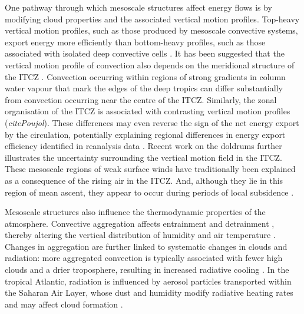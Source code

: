 \documentclass[acp, manuscript]{copernicus}
\begin{document}
One pathway through which mesoscale structures affect energy flows is by modifying cloud properties and the associated vertical motion profiles.
Top-heavy vertical motion profiles, such as those produced by mesoscale convective systems, export energy more efficiently than bottom-heavy profiles, such as those associated with isolated deep convective cells \citep[e.g.,][]{Houze2004}.
It has been suggested that the vertical motion profile of convection also depends on the meridional structure of the ITCZ \citep{masunagaEdgeIntensificationEastern2023}.
Convection occurring within regions of strong gradients in column water vapour that mark the edges of the deep tropics \citep{Mapes2018, masunagaMechanismMaintenanceSharp2020} can differ substantially from convection occurring near the centre of the ITCZ.
Similarly, the zonal organisation of the ITCZ is associated with contrasting vertical motion profiles (\textit{citePoujol}). 
These differences may even reverse the sign of the net energy export by the circulation, potentially explaining regional differences in energy export efficiency identified in reanalysis data \citep{backGeographicVariabilityExport2006}.
Recent work on the doldrums further illustrates the uncertainty surrounding the vertical motion field in the ITCZ.
These mesoscale regions of weak surface winds have traditionally been explained as a consequence of the rising air in the ITCZ.
And, although they lie in this region of mean ascent, they appear to occur during periods of local subsidence \citep{windmillerCalmVariableInner2024}.

Mesoscale structures also influence the thermodynamic properties of the atmosphere. Convective aggregation affects entrainment and detrainment \citep{beckerEstimatingBulkEntrainment2018}, thereby altering the vertical distribution of humidity and air temperature \citep[e.g.,][]{singhInfluenceEntrainmentThermal2013}.
Changes in aggregation are further linked to systematic changes in clouds and radiation: more aggregated convection is typically associated with fewer high clouds and a drier troposphere, resulting in increased radiative cooling \citep[e.g.,][]{Tobin2012, bonyObservedModulationTropical2020}.
In the tropical Atlantic, radiation is influenced by aerosol particles transported within the Saharan Air Layer, whose dust and humidity modify radiative heating rates and may affect cloud formation \citep{gutlebenImpactsWaterVapor2019}.
\end{document}
